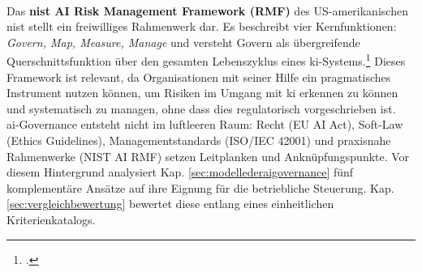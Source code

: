 \\
Das \textbf{\acs{nist} AI Risk Management Framework (RMF)} des US-amerikanischen \acf{nist} stellt ein freiwilliges Rahmenwerk dar.
Es beschreibt vier Kernfunktionen: \textit{Govern, Map, Measure, Manage} und versteht \glqq{}Govern\grqq{} als übergreifende Querschnittsfunktion über den gesamten Lebenszyklus eines \ac{ki}-Systems.\footcite[21-24]{nationalinstituteofstandardsandtechnologyAIRiskManagement2021}
Dieses Framework ist relevant, da Organisationen mit seiner Hilfe ein pragmatisches Instrument nutzen können, um Risiken im Umgang mit \ac{ki} erkennen zu können und systematisch zu managen, ohne dass dies regulatorisch vorgeschrieben ist.
\\
\ac{ai}-Governance entsteht nicht im luftleeren Raum: Recht (EU AI Act), Soft-Law (Ethics Guidelines), Managementstandards (ISO/IEC 42001) und praxisnahe Rahmenwerke (NIST AI RMF) setzen Leitplanken und Anknüpfungspunkte.
Vor diesem Hintergrund analysiert Kap. \ref{sec:modellederaigovernance} fünf komplementäre Ansätze auf ihre Eignung für die betriebliche Steuerung. Kap. \ref{sec:vergleichbewertung} bewertet diese entlang eines einheitlichen Kriterienkatalogs.